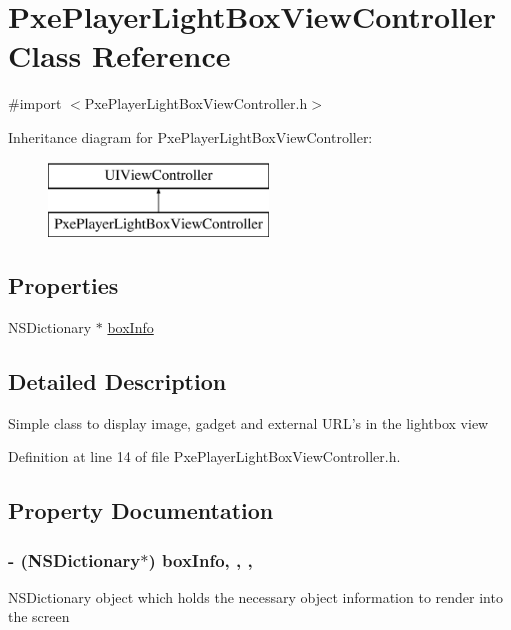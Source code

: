 \hypertarget{interface_pxe_player_light_box_view_controller}{\section{Pxe\-Player\-Light\-Box\-View\-Controller Class Reference}
\label{interface_pxe_player_light_box_view_controller}
}


{\ttfamily \#import $<$Pxe\-Player\-Light\-Box\-View\-Controller.\-h$>$}

Inheritance diagram for Pxe\-Player\-Light\-Box\-View\-Controller\-:\begin{figure}[H]
\begin{center}
\leavevmode
\includegraphics[height=2.000000cm]{interface_pxe_player_light_box_view_controller}
\end{center}
\end{figure}
\subsection*{Properties}
\begin{DoxyCompactItemize}
\item 
N\-S\-Dictionary $\ast$ \hyperlink{interface_pxe_player_light_box_view_controller_a0603939be7a9337d50eedf4e1b5116bf}{box\-Info}
\end{DoxyCompactItemize}


\subsection{Detailed Description}
Simple class to display image, gadget and external U\-R\-L's in the lightbox view 

Definition at line 14 of file Pxe\-Player\-Light\-Box\-View\-Controller.\-h.



\subsection{Property Documentation}
\hypertarget{interface_pxe_player_light_box_view_controller_a0603939be7a9337d50eedf4e1b5116bf}{
\subsubsection[{box\-Info}]{\setlength{\rightskip}{0pt plus 5cm}-\/ (N\-S\-Dictionary$\ast$) box\-Info\hspace{0.3cm}{\ttfamily [read]}, {\ttfamily [write]}, {\ttfamily [nonatomic]}, {\ttfamily [strong]}}}\label{interface_pxe_player_light_box_view_controller_a0603939be7a9337d50eedf4e1b5116bf}
N\-S\-Dictionary object which holds the necessary object information to render into the screen 

